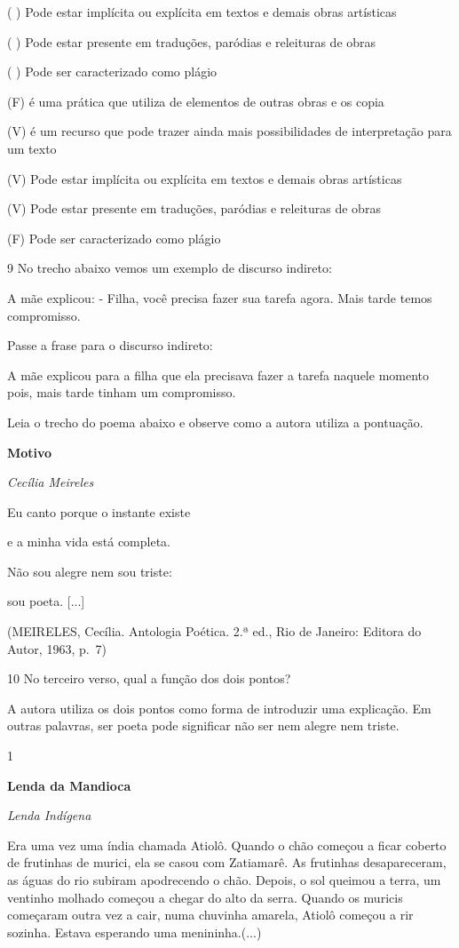 {( ) Pode estar implícita ou explícita em textos e demais obras
artísticas

( ) Pode estar presente em traduções, paródias e releituras de obras


( ) Pode ser caracterizado como plágio


(F) é uma prática que utiliza de elementos de outras obras e os copia


(V) é um recurso que pode trazer ainda mais possibilidades de
interpretação para um texto


(V) Pode estar implícita ou explícita em textos e demais obras
artísticas

(V) Pode estar presente em traduções, paródias e releituras de obras


(F) Pode ser caracterizado como plágio


\num{9} No trecho abaixo vemos um exemplo de discurso indireto:

A mãe explicou: - Filha, você precisa fazer sua tarefa agora. Mais tarde
temos compromisso.

Passe a frase para o discurso indireto:

A mãe explicou para a filha que ela precisava fazer a tarefa naquele
momento pois, mais tarde tinham um compromisso.

Leia o trecho do poema abaixo e observe como a autora utiliza a
pontuação.

\textbf{Motivo}

\emph{Cecília Meireles}

Eu canto porque o instante existe

e a minha vida está completa.

Não sou alegre nem sou triste:

sou poeta. {[}...{]}

(MEIRELES, Cecília. Antologia Poética. 2.ª ed., Rio de Janeiro: Editora
do Autor, 1963, p.~7)

\num{10} No terceiro verso, qual a função dos dois pontos?

A autora utiliza os dois pontos como forma de introduzir uma explicação.
Em outras palavras, ser poeta pode significar não ser nem alegre nem
triste.


\num{1}

\textbf{Lenda da Mandioca}

\emph{Lenda Indígena}

Era uma vez uma índia chamada Atiolô. Quando o chão começou a ficar
coberto de frutinhas de murici, ela se casou com Zatiamarê. As frutinhas
desapareceram, as águas do rio subiram apodrecendo o chão. Depois, o sol
queimou a terra, um ventinho molhado começou a chegar do alto da serra.
Quando os muricis começaram outra vez a cair, numa chuvinha amarela,
Atiolô começou a rir sozinha. Estava esperando uma menininha.(...)

}
